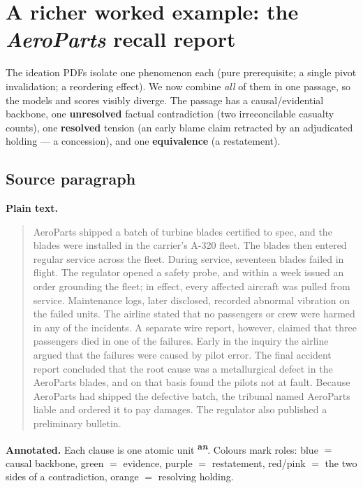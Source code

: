 \documentclass[11pt]{article}
\begin{document}
\section{A richer worked example: the \emph{AeroParts} recall report}
\label{sec:example}

The ideation PDFs isolate one phenomenon each (pure prerequisite; a single pivot
invalidation; a reordering effect). We now combine \emph{all} of them in one passage, so
the models and scores visibly diverge. The passage has a causal/evidential backbone, one
\textbf{unresolved} factual contradiction (two irreconcilable casualty counts), one
\textbf{resolved} tension (an early blame claim retracted by an adjudicated holding ---
a concession), and one \textbf{equivalence} (a restatement).

\subsection*{Source paragraph}
\noindent\textbf{Plain text.}
\begin{quote}
AeroParts shipped a batch of turbine blades certified to spec, and the blades were
installed in the carrier's A-320 fleet. The blades then entered regular service across the
fleet. During service, seventeen blades failed in flight. The regulator opened a safety
probe, and within a week issued an order grounding the fleet; in effect, every affected
aircraft was pulled from service. Maintenance logs, later disclosed, recorded abnormal
vibration on the failed units. The airline stated that no passengers or crew were harmed in
any of the incidents. A separate wire report, however, claimed that three passengers died
in one of the failures. Early in the inquiry the airline argued that the failures were
caused by pilot error. The final accident report concluded that the root cause was a
metallurgical defect in the AeroParts blades, and on that basis found the pilots not at
fault. Because AeroParts had shipped the defective batch, the tribunal named AeroParts
liable and ordered it to pay damages. The regulator also published a preliminary bulletin.
\end{quote}

\noindent\textbf{Annotated.} Each clause is one atomic unit
\textsuperscript{\textbf{\scriptsize a\textit{n}}}. Colours mark roles: blue $=$ causal
backbone, green $=$ evidence, purple $=$ restatement, red/pink $=$ the two sides of a
contradiction, orange $=$ resolving holding.
\end{document}
